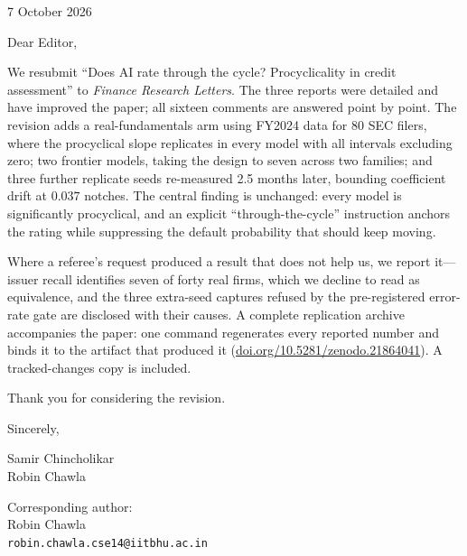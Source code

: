 \documentclass[11pt]{article}
\begin{document}
\hfill 7 October 2026

\medskip
Dear Editor,

We resubmit ``Does AI rate through the cycle? Procyclicality in credit assessment'' to
\emph{Finance Research Letters}. The three reports were detailed and have improved the paper; all
sixteen comments are answered point by point. The revision adds a real-fundamentals arm using
FY2024 data for 80 SEC filers, where the procyclical slope replicates in every model with all
intervals excluding zero; two frontier models, taking the design to seven across two families; and
three further replicate seeds re-measured 2.5 months later, bounding coefficient drift at $0.037$
notches. The central finding is unchanged: every model is significantly procyclical, and an
explicit ``through-the-cycle'' instruction anchors the rating while suppressing the default
probability that should keep moving.

Where a referee's request produced a result that does not help us, we report it---issuer recall
identifies seven of forty real firms, which we decline to read as equivalence, and the three
extra-seed captures refused by the pre-registered error-rate gate are disclosed with their causes.
A complete replication archive accompanies the paper: one command regenerates every reported
number and binds it to the artifact that produced it
(\url{doi.org/10.5281/zenodo.21864041}). A tracked-changes copy is included.

Thank you for considering the revision.

Sincerely,

Samir Chincholikar \\
Robin Chawla

\medskip
Corresponding author: \\
Robin Chawla \\
\texttt{robin.chawla.cse14@iitbhu.ac.in}
\end{document}
